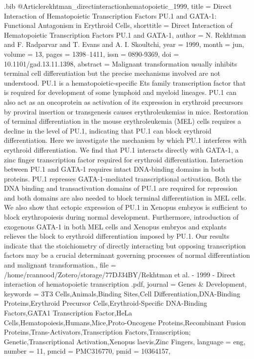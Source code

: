 \documentclass[
  table,
  10pt,
  a4paper]{article}
\begin{document}
\begin{filecontents}{\jobname.bib}
@Article{rekhtman_directinteractionhematopoietic_1999,
	title = {Direct Interaction of Hematopoietic Transcription Factors {{PU}}.1 and {{GATA}}-1: Functional Antagonism in Erythroid Cells},
	shorttitle = {Direct Interaction of Hematopoietic Transcription Factors {{PU}}.1 and {{GATA}}-1},
	author = {N. Rekhtman and F. Radparvar and T. Evans and A. I. Skoultchi},
	year = {1999},
	month = {jun},
	volume = {13},
	pages = {1398--1411},
	issn = {0890-9369},
	doi = {10.1101/gad.13.11.1398},
	abstract = {Malignant transformation usually inhibits terminal cell differentiation but the precise mechanisms involved are not understood. PU.1 is a hematopoietic-specific Ets family transcription factor that is required for development of some lymphoid and myeloid lineages. PU.1 can also act as an oncoprotein as activation of its expression in erythroid precursors by proviral insertion or transgenesis causes erythroleukemias in mice. Restoration of terminal differentiation in the mouse erythroleukemia (MEL) cells requires a decline in the level of PU.1, indicating that PU.1 can block erythroid differentiation. Here we investigate the mechanism by which PU.1 interferes with erythroid differentiation. We find that PU.1 interacts directly with GATA-1, a zinc finger transcription factor required for erythroid differentiation. Interaction between PU.1 and GATA-1 requires intact DNA-binding domains in both proteins. PU.1 represses GATA-1-mediated transcriptional activation. Both the DNA binding and transactivation domains of PU.1 are required for repression and both domains are also needed to block terminal differentiation in MEL cells. We also show that ectopic expression of PU.1 in Xenopus embryos is sufficient to block erythropoiesis during normal development. Furthermore, introduction of exogenous GATA-1 in both MEL cells and Xenopus embryos and explants relieves the block to erythroid differentiation imposed by PU.1. Our results indicate that the stoichiometry of directly interacting but opposing transcription factors may be a crucial determinant governing processes of normal differentiation and malignant transformation.},
	file = {/home/rcannood/Zotero/storage/77DJ34BY/Rekhtman et al. - 1999 - Direct interaction of hematopoietic transcription .pdf},
	journal = {Genes \& Development},
	keywords = {3T3 Cells,Animals,Binding Sites,Cell Differentiation,DNA-Binding Proteins,Erythroid Precursor Cells,Erythroid-Specific DNA-Binding Factors,GATA1 Transcription Factor,HeLa Cells,Hematopoiesis,Humans,Mice,Proto-Oncogene Proteins,Recombinant Fusion Proteins,Trans-Activators,Transcription Factors,Transcription; Genetic,Transcriptional Activation,Xenopus laevis,Zinc Fingers},
	language = {eng},
	number = {11},
	pmcid = {PMC316770},
	pmid = {10364157},
}


\end{filecontents}
\end{document}
